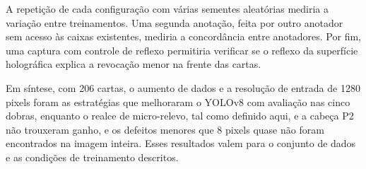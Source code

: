 \documentclass[
    12pt,                %
    openright,           %
    oneside,             %
    a4paper,             %
    english,             %
    brazil               %
]{abntex2}
\begin{document}
A repetição de cada configuração com várias sementes aleatórias mediria
a variação entre treinamentos. Uma segunda anotação, feita por outro
anotador sem acesso às caixas existentes, mediria a concordância entre
anotadores. Por fim, uma captura com controle de reflexo permitiria
verificar se o reflexo da superfície holográfica explica a revocação
menor na frente das cartas.

Em síntese, com 206 cartas, o aumento de dados e a resolução de entrada
de 1280 pixels foram as
estratégias que melhoraram o YOLOv8 com avaliação nas cinco dobras,
enquanto o realce de micro-relevo, tal como definido aqui, e a cabeça
P2 não trouxeram ganho, e os defeitos menores que 8 pixels quase não
foram encontrados na imagem inteira. Esses resultados valem para o
conjunto de dados e as condições de treinamento descritos.

\postextual


\end{document}
